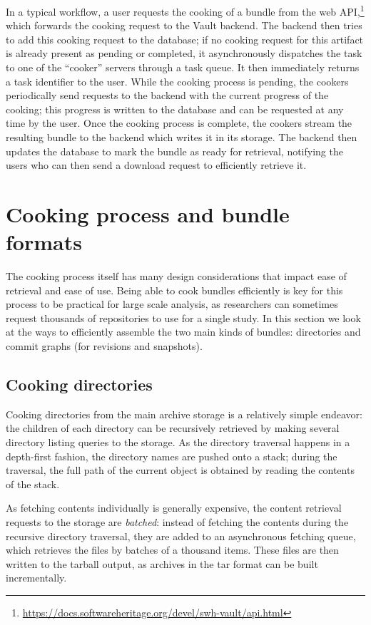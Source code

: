 In a typical workflow, a user requests the cooking of a bundle from the web
API,\footnote{\url{https://docs.softwareheritage.org/devel/swh-vault/api.html}}
which forwards the cooking request to the Vault backend. The backend then tries
to add this cooking request to the database; if no cooking request for this
artifact is already present as pending or completed, it asynchronously
dispatches the task to one of the ``cooker'' servers through a task queue. It
then immediately returns a task identifier to the user. While the cooking
process is pending, the cookers periodically send requests to the backend with
the current progress of the cooking; this progress is written to the database
and can be requested at any time by the user. Once the cooking process is
complete, the cookers stream the resulting bundle to the backend which writes
it in its storage. The backend then updates the database to mark the bundle as
ready for retrieval, notifying the users who can then send a download request
to efficiently retrieve it.

\section{Cooking process and bundle formats}

The cooking process itself has many design considerations that impact ease of
retrieval and ease of use. Being able to cook bundles efficiently is key for
this process to be practical for large scale analysis, as researchers can
sometimes request thousands of repositories to use for a single study. In this
section we look at the ways to efficiently assemble the two main kinds of
bundles: directories and commit graphs (for revisions and snapshots).

\subsection{Cooking directories}

Cooking directories from the main archive storage is a relatively simple
endeavor: the children of each directory can be recursively retrieved by
making several directory listing queries to the storage. As the directory
traversal happens in a depth-first fashion, the directory names are pushed onto
a stack; during the traversal, the full path of the current object is obtained
by reading the contents of the stack.

As fetching contents individually is generally expensive, the content retrieval
requests to the storage are \emph{batched}: instead of fetching the contents
during the recursive directory traversal, they are added to an asynchronous
fetching queue, which retrieves the files by batches of a thousand items. These
files are then written to the tarball output, as archives in the tar format can
be built incrementally.

